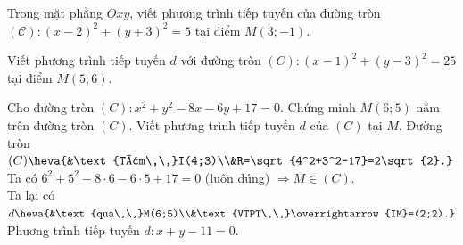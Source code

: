 \begin{vd}
	Trong mặt phẳng $Oxy$, viết phương trình tiếp tuyến của đường tròn $\mathscr{(C)} \colon  (x-2)^2+(y+3)^2=5$ tại điểm $M(3;-1)$.
\end{vd}

\begin{vd}%
	Viết phương trình tiếp tuyến $d$ với đường tròn $(C)\colon (x-1)^2+(y-3)^2=25$ tại điểm $M(5;6)$.
\end{vd}

\begin{vd}%
	Cho đường tròn $ (C)\colon x^2+y^2-8x-6y+17=0 $. Chứng minh $ M(6;5) $ nằm trên đường tròn $ (C) $. Viết phương trình tiếp tuyến $ d $ của $ (C) $ tại $ M $.
	\loigiai
	{
		Đường tròn $ (C)\heva{&\text{Tâm\,\,}I(4;3)\\&R=\sqrt{4^2+3^2-17}=2\sqrt{2}.} $\\
		Ta có $ 6^2+5^2-8\cdot 6-6\cdot 5+17=0 $ \quad(luôn đúng) $ \Rightarrow M\in (C) $.\\
		Ta lại có $ d \heva{&\text{qua\,\,}M(6;5)\\&\text{VTPT\,\,}\overrightarrow{IM}=(2;2).} $\\
		Phương trình tiếp tuyến $ d \colon x+y-11=0 $.
	}
\end{vd}

